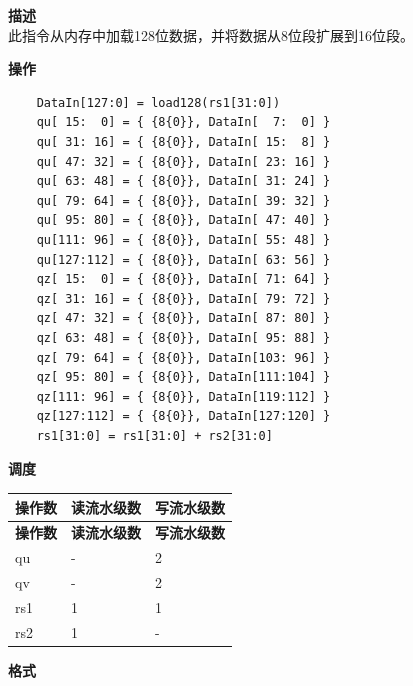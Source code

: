 \textbf{描述}\\
此指令从内存中加载128位数据，并将数据从8位段扩展到16位段。

\textbf{操作}\\
\begin{lstlisting}
    DataIn[127:0] = load128(rs1[31:0])
    qu[ 15:  0] = { {8{0}}, DataIn[  7:  0] }
    qu[ 31: 16] = { {8{0}}, DataIn[ 15:  8] }
    qu[ 47: 32] = { {8{0}}, DataIn[ 23: 16] }
    qu[ 63: 48] = { {8{0}}, DataIn[ 31: 24] }
    qu[ 79: 64] = { {8{0}}, DataIn[ 39: 32] }
    qu[ 95: 80] = { {8{0}}, DataIn[ 47: 40] }
    qu[111: 96] = { {8{0}}, DataIn[ 55: 48] }
    qu[127:112] = { {8{0}}, DataIn[ 63: 56] }
    qz[ 15:  0] = { {8{0}}, DataIn[ 71: 64] }
    qz[ 31: 16] = { {8{0}}, DataIn[ 79: 72] }
    qz[ 47: 32] = { {8{0}}, DataIn[ 87: 80] }
    qz[ 63: 48] = { {8{0}}, DataIn[ 95: 88] }
    qz[ 79: 64] = { {8{0}}, DataIn[103: 96] }
    qz[ 95: 80] = { {8{0}}, DataIn[111:104] }
    qz[111: 96] = { {8{0}}, DataIn[119:112] }
    qz[127:112] = { {8{0}}, DataIn[127:120] }
    rs1[31:0] = rs1[31:0] + rs2[31:0]
\end{lstlisting}

\textbf{调度}\\
\begin{longtable}[c]{|l|l|l|}
    \hline
    \rowcolor{lightgray}
    \textbf{操作数} & \textbf{读流水级数} & \textbf{写流水级数} \\\hline
    \endfirsthead
    \hline
    \rowcolor{lightgray}
     \textbf{操作数} & \textbf{读流水级数} & \textbf{写流水级数} \\\hline
    \endhead
    \hline
    \endfoot

  qu & - & 2 \\\hline
  qv & - & 2 \\\hline
  rs1 & 1 & 1 \\\hline
    rs2 & 1 & -

\end{longtable}

\textbf{格式}\\


